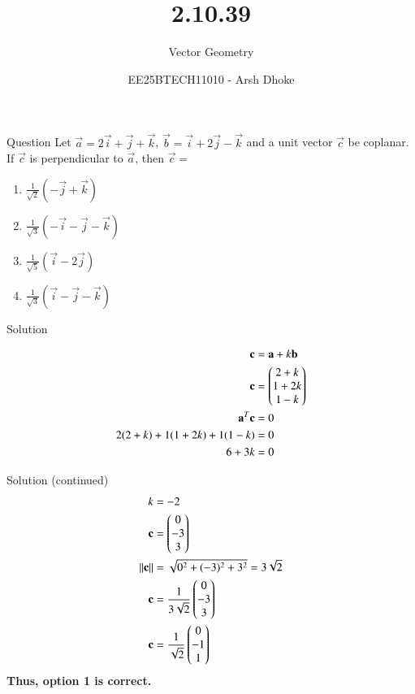\documentclass{beamer}
\title{2.10.39}
\subtitle{Vector Geometry}
\author{EE25BTECH11010 - Arsh Dhoke}
\date{}
\begin{document}
\begin{frame}
\titlepage
\end{frame}

\begin{frame}{Question}
Let $\vec{a}=2\vec{i}+\vec{j}+\vec{k}$,\quad
$\vec{b}=\vec{i}+2\vec{j}-\vec{k}$ and a unit vector $\vec{c}$ be coplanar.  
If $\vec{c}$ is perpendicular to $\vec{a}$, then $\vec{c}=$

\begin{multicols}{2}
\begin{enumerate}
\item \( \tfrac{1}{\sqrt{2}}(-\vec{j}+\vec{k})\) 
\item \( \tfrac{1}{\sqrt{3}}(-\vec{i}-\vec{j}-\vec{k})\) 
\item \( \tfrac{1}{\sqrt{5}}(\vec{i}-2\vec{j})\) 
\item \( \tfrac{1}{\sqrt{3}}(\vec{i}-\vec{j}-\vec{k})\) 
\end{enumerate}
\end{multicols}
\end{frame}

\begin{frame}{Solution}


\begin{align}
\mathbf{c}&=\mathbf{a}+k\mathbf{b} \\
\mathbf{c}&=\begin{pmatrix}2+k\\1+2k\\1-k\end{pmatrix} \\
\mathbf{a}^T\mathbf{c}&=0 \\
2(2+k)+1(1+2k)+1(1-k)&=0 \\
6+3k&=0 
\end{align}
\end{frame}

\begin{frame}{Solution (continued)}
\begin{align}
k&=-2 \\
\mathbf{c}&=\begin{pmatrix}0\\-3\\3\end{pmatrix} \\
\|\mathbf{c}\| &=\sqrt{0^2+(-3)^2+3^2}=3\sqrt{2} \\
\mathbf{c}&=\frac{1}{3\sqrt{2}}\begin{pmatrix}0\\-3\\3\end{pmatrix} \\
\mathbf{c}&=\frac{1}{\sqrt{2}}\begin{pmatrix}0\\-1\\1\end{pmatrix}
\end{align}
\textbf{Thus, option 1 is correct.}
\end{frame}
\end{document}
